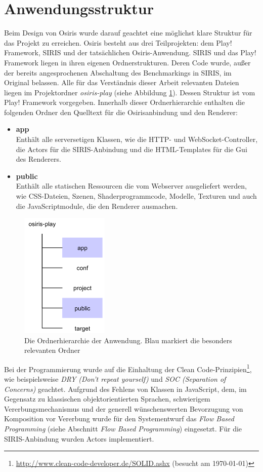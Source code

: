 \section{Anwendungsstruktur}
Beim Design von Osiris wurde darauf geachtet eine möglichst klare Struktur für das Projekt zu erreichen. Osiris besteht aus drei Teilprojekten: dem Play! Framework, SIRIS und der tatsächlichen Osiris-Anwendung. SIRIS und das Play! Framework liegen in ihren eigenen Ordnerstrukturen. Deren Code wurde, außer der bereits angesprochenen Abschaltung des Benchmarkings in SIRIS, im Original belassen. Alle für das Verständnis dieser Arbeit relevanten Dateien liegen im Projektordner \textit{osiris-play} (siehe Abbildung \ref{fig:playapp}). Dessen Struktur ist vom Play! Framework vorgegeben. Innerhalb dieser Ordnerhierarchie enthalten die folgenden Ordner den Quelltext für die Osirisanbindung und den Renderer:
\begin{itemize}
    \item \textbf{app}\\
Enthält alle serversetigen Klassen, wie die HTTP- und WebSocket-Controller, die Actors für die SIRIS-Anbindung und die HTML-Templates für die Gui des Renderers.
    \item \textbf{public}\\
Enthält alle statischen Ressourcen die vom Webserver ausgeliefert werden, wie CSS-Dateien, Szenen, Shaderprogrammcode, Modelle, Texturen und auch die JavaScriptmodule, die den Renderer ausmachen.
\end{itemize}
\begin{figure}
\centering
\includegraphics[height=60mm]{bilder/playapp.png}
\caption{Die Ordnerhierarchie der Anwendung. Blau markiert die besonders relevanten Ordner}
\label{fig:playapp}
\end{figure}

Bei der Programmierung wurde auf die Einhaltung der Clean Code-Prinzipien\footnote{\url{http://www.clean-code-developer.de/SOLID.ashx} (besucht am \today)}, wie beispielsweise \textit{DRY (Don't repeat yourself)} und \textit{SOC (Separation of Concerns)} geachtet. Aufgrund des Fehlens von Klassen in JavaScript, dem, im Gegensatz zu klassischen objektorientierten Sprachen, schwierigem Vererbungsmechanismus und der generell wünschenswerten Bevorzugung von Komposition vor Vererbung wurde für den Systementwurf das \textit{Flow Based Programming} (siehe Abschnitt \textit{Flow Based Programming}) eingesetzt. Für die SIRIS-Anbindung wurden Actors implementiert.

